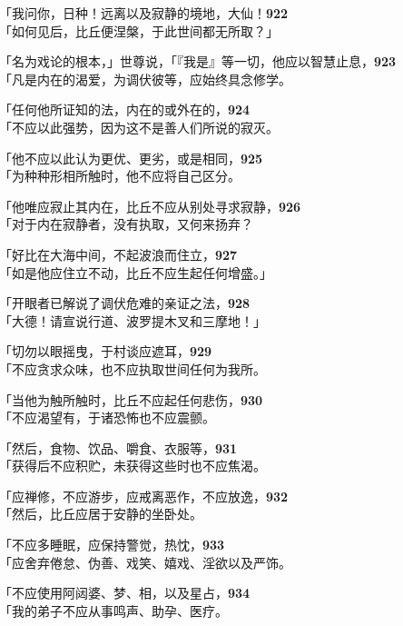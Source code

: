 「我问你，日种！远离以及寂静的境地，大仙！\hfill{\grayfootnotesize \textbf{922}} \\
「如何见后，比丘便涅槃，于此世间都无所取？」


「名为戏论的根本，」世尊说，「『我是』等一切，他应以智慧止息，\hfill{\grayfootnotesize \textbf{923}} \\
「凡是内在的渴爱，为调伏彼等，应始终具念修学。


「任何他所证知的法，内在的或外在的，\hfill{\grayfootnotesize \textbf{924}} \\
「不应以此强势，因为这不是善人们所说的寂灭。


「他不应以此认为更优、更劣，或是相同，\hfill{\grayfootnotesize \textbf{925}} \\
「为种种形相所触时，他不应将自己区分。


「他唯应寂止其内在，比丘不应从别处寻求寂静，\hfill{\grayfootnotesize \textbf{926}} \\
「对于内在寂静者，没有执取，又何来扬弃？


「好比在大海中间，不起波浪而住立，\hfill{\grayfootnotesize \textbf{927}} \\
「如是他应住立不动，比丘不应生起任何增盛。」


「开眼者已解说了调伏危难的亲证之法，\hfill{\grayfootnotesize \textbf{928}} \\
「大德！请宣说行道、波罗提木叉和三摩地！」


「切勿以眼摇曳，于村谈应遮耳，\hfill{\grayfootnotesize \textbf{929}} \\
「不应贪求众味，也不应执取世间任何为我所。


「当他为触所触时，比丘不应起任何悲伤，\hfill{\grayfootnotesize \textbf{930}} \\
「不应渴望有，于诸恐怖也不应震颤。


「然后，食物、饮品、嚼食、衣服等，\hfill{\grayfootnotesize \textbf{931}} \\
「获得后不应积贮，未获得这些时也不应焦渴。


「应禅修，不应游步，应戒离恶作，不应放逸，\hfill{\grayfootnotesize \textbf{932}} \\
「然后，比丘应居于安静的坐卧处。


「不应多睡眠，应保持警觉，热忱，\hfill{\grayfootnotesize \textbf{933}} \\
「应舍弃倦怠、伪善、戏笑、嬉戏、淫欲以及严饰。


「不应使用阿闼婆、梦、相，以及星占，\hfill{\grayfootnotesize \textbf{934}} \\
「我的弟子不应从事鸣声、助孕、医疗。


